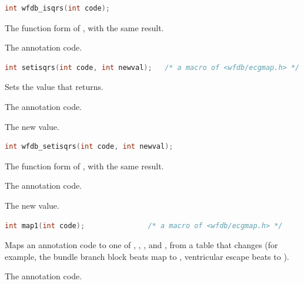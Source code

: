 \begin{lstlisting}[language=C,style=signature]
int wfdb_isqrs(int code);
\end{lstlisting}
The function form of , with the same result.
\begin{params}
\item[code] The annotation code.
\end{params}

\begin{lstlisting}[language=C,style=signature]
int setisqrs(int code, int newval);   /* a macro of <wfdb/ecgmap.h> */
\end{lstlisting}
Sets the value that  returns.
\begin{params}
\item[code] The annotation code.
\item[newval] The new value.
\end{params}

\begin{lstlisting}[language=C,style=signature]
int wfdb_setisqrs(int code, int newval);
\end{lstlisting}
The function form of , with the same result.
\begin{params}
\item[code] The annotation code.
\item[newval] The new value.
\end{params}

\begin{lstlisting}[language=C,style=signature]
int map1(int code);               /* a macro of <wfdb/ecgmap.h> */
\end{lstlisting}
Maps an annotation code to one of , , ,
 and , from a table that  changes (for
example, the bundle branch block beats map to , ventricular
escape beats to ).
\begin{params}
\item[code] The annotation code.
\end{params}

